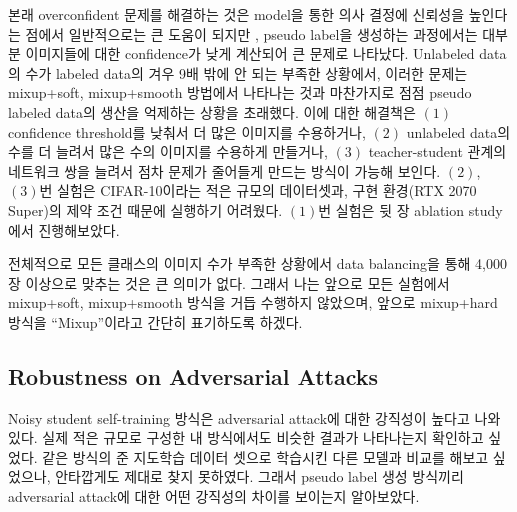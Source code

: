 \documentclass[a4paper, 10pt]{article}
\begin{document}
본래 overconfident 문제를 해결하는 것은 model을 통한 의사 결정에 신뢰성을
높인다는 점에서 일반적으로는 큰 도움이 되지만 \cite{guo2017calibration}, pseudo
label을 생성하는 과정에서는 대부분 이미지들에 대한 confidence가 낮게 계산되어 큰
문제로 나타났다. Unlabeled data의 수가 labeled data의 겨우 9배 밖에 안 되는
부족한 상황에서, 이러한 문제는 mixup+soft, mixup+smooth 방법에서 나타나는 것과
마찬가지로 점점 pseudo labeled data의 생산을 억제하는 상황을 초래했다. 이에 대한
해결책은 $(1)$ confidence threshold를 낮춰서 더 많은 이미지를 수용하거나, $(2)$
unlabeled data의 수를 더 늘려서 많은 수의 이미지를 수용하게 만들거나, $(3)$
teacher-student 관계의 네트워크 쌍을 늘려서 점차 문제가 줄어들게 만드는 방식이
가능해 보인다. $(2)$, $(3)$번 실험은 CIFAR-10이라는 적은 규모의 데이터셋과, 구현
환경(RTX 2070 Super)의 제약 조건 때문에 실행하기 어려웠다. $(1)$번 실험은 뒷 장
ablation study에서 진행해보았다.

전체적으로 모든 클래스의 이미지 수가 부족한 상황에서 data balancing을 통해
4,000장 이상으로 맞추는 것은 큰 의미가 없다. 그래서 나는 앞으로 모든 실험에서
mixup+soft, mixup+smooth 방식을 거듭 수행하지 않았으며, 앞으로 mixup+hard 방식을
``Mixup''이라고 간단히 표기하도록 하겠다.

\subsection{Robustness on Adversarial Attacks}
Noisy student self-training 방식은 adversarial attack에 대한 강직성이 높다고
나와있다. \cite{xie2020selftraining} 실제 적은 규모로 구성한 내 방식에서도
비슷한 결과가 나타나는지 확인하고 싶었다. 같은 방식의 준 지도학습 데이터 셋으로
학습시킨 다른 모델과 비교를 해보고 싶었으나, 안타깝게도 제대로 찾지 못하였다.
그래서 pseudo label 생성 방식끼리 adversarial attack에 대한 어떤 강직성의 차이를
보이는지 알아보았다.
\end{document}
